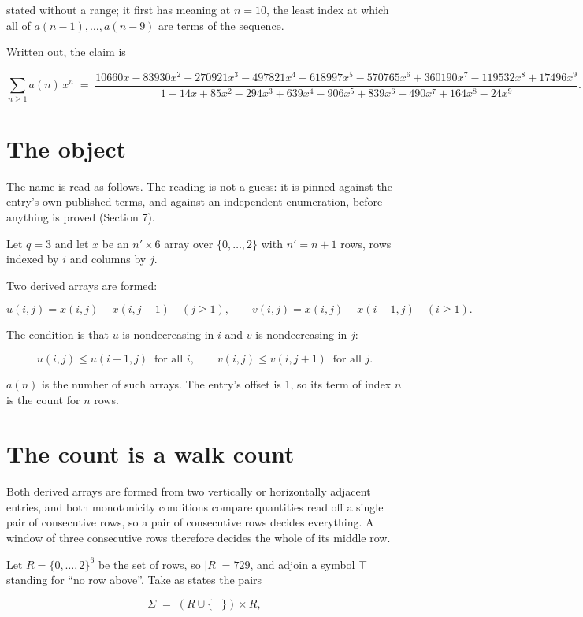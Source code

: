 \documentclass[11pt]{article}
\theoremstyle{definition}
\begin{document}
stated without a range; it first has meaning at $n = 10$, the least index at which all of $a(n-1),\dots,a(n-9)$ are terms of the sequence.

Written out, the claim is

\[\sum_{n \ge 1} a(n)\,x^n \;=\; \frac{10660x - 83930x^{2} + 270921x^{3} - 497821x^{4} + 618997x^{5} - 570765x^{6} + 360190x^{7} - 119532x^{8} + 17496x^{9}}{1 - 14x + 85x^{2} - 294x^{3} + 639x^{4} - 906x^{5} + 839x^{6} - 490x^{7} + 164x^{8} - 24x^{9}}.\]

\section{The object}

The name is read as follows. The reading is not a guess: it is pinned against the entry's own published terms, and against an independent enumeration, before anything is proved (Section 7).

Let $q = 3$ and let $x$ be an $n' \times 6$ array over $\{0,\dots,2\}$ with $n' = n + 1$ rows, rows indexed by $i$ and columns by $j$.

Two derived arrays are formed:

\[u(i,j) = x(i,j) - x(i,j{-}1)\quad (j \ge 1), \qquad v(i,j) = x(i,j) - x(i{-}1,j)\quad (i \ge 1).\]

The condition is that $u$ is nondecreasing in $i$ and $v$ is nondecreasing in $j$:

\[u(i,j) \le u(i{+}1,j) \ \text{ for all } i, \qquad v(i,j) \le v(i,j{+}1) \ \text{ for all } j.\]

$a(n)$ is the number of such arrays. The entry's offset is 1, so its term of index $n$ is the count for $n$ rows.

\section{The count is a walk count}

Both derived arrays are formed from two vertically or horizontally adjacent entries, and both monotonicity conditions compare quantities read off a single pair of consecutive rows, so a pair of consecutive rows decides everything. A window of three consecutive rows therefore decides the whole of its middle row.

Let $R = \{0,\dots,2\}^{6}$ be the set of rows, so $|R| = 729$, and adjoin a symbol $\top$ standing for ``no row above''. Take as states the pairs

\[\Sigma \;=\; (R \cup \{\top\}) \times R,\]
\end{document}
